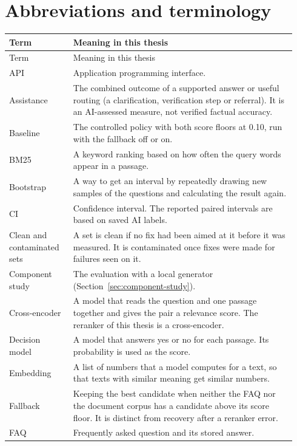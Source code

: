 \section*{Abbreviations and terminology}
\begin{longtable}{@{}>{\raggedright\arraybackslash}p{0.21\linewidth}>{\raggedright\arraybackslash}p{0.73\linewidth}@{}}
\toprule
Term & Meaning in this thesis \\
\midrule
\endfirsthead
\toprule
Term & Meaning in this thesis \\
\midrule
\endhead
API & Application programming interface. \\
Assistance & The combined outcome of a supported answer or useful routing (a clarification, verification step or referral). It is an AI-assessed measure, not verified factual accuracy. \\
Baseline & The controlled policy with both score floors at 0.10, run with the fallback off or on. \\
BM25 & A keyword ranking based on how often the query words appear in a passage. \\
Bootstrap & A way to get an interval by repeatedly drawing new samples of the questions and calculating the result again. \\
CI & Confidence interval. The reported paired intervals are based on saved AI labels. \\
Clean and contaminated sets & A set is clean if no fix had been aimed at it before it was measured. It is contaminated once fixes were made for failures seen on it. \\
Component study & The evaluation with a local generator (Section~\ref{sec:component-study}). \\
Cross-encoder & A model that reads the question and one passage together and gives the pair a relevance score. The reranker of this thesis is a cross-encoder. \\
Decision model & A model that answers yes or no for each passage. Its probability is used as the score. \\
Embedding & A list of numbers that a model computes for a text, so that texts with similar meaning get similar numbers. \\
Fallback & Keeping the best candidate when neither the FAQ nor the document corpus has a candidate above its score floor. It is distinct from recovery after a reranker error. \\
FAQ & Frequently asked question and its stored answer. \\

\end{longtable}
